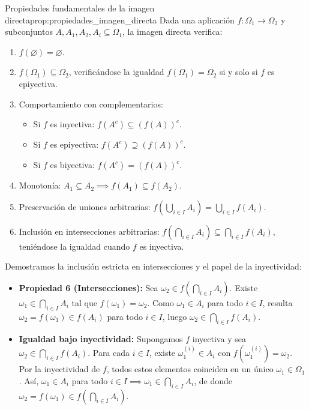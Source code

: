 \begin{proposicion}{Propiedades fundamentales de la imagen directa}{prop:propiedades_imagen_directa}
Dada una aplicación $f: \Omega_1 \to \Omega_2$ y subconjuntos $A, A_1, A_2, A_i \subseteq \Omega_1$, la imagen directa verifica:
\begin{enumerate}[label=\arabic*)]
    \item $f(\varnothing) = \varnothing$.
    \item $f(\Omega_1) \subseteq \Omega_2$, verificándose la igualdad $f(\Omega_1) = \Omega_2$ si y solo si $f$ es epiyectiva.
    \item Comportamiento con complementarios:
    \begin{itemize}
        \item Si $f$ es inyectiva: $f(A^c) \subseteq (f(A))^c$.
        \item Si $f$ es epiyectiva: $f(A^c) \supseteq (f(A))^c$.
        \item Si $f$ es biyectiva: $f(A^c) = (f(A))^c$.
    \end{itemize}
    \item Monotonía: $A_1 \subseteq A_2 \implies f(A_1) \subseteq f(A_2)$.
    \item Preservación de uniones arbitrarias: $\displaystyle f\left( \bigcup_{i \in I} A_i \right) = \bigcup_{i \in I} f(A_i)$.
    \item Inclusión en intersecciones arbitrarias: $\displaystyle f\left( \bigcap_{i \in I} A_i \right) \subseteq \bigcap_{i \in I} f(A_i)$, teniéndose la igualdad cuando $f$ es inyectiva.
\end{enumerate}

\tcblower

\begin{demostracion}
Demostramos la inclusión estricta en intersecciones y el papel de la inyectividad:
\begin{itemize}
    \item \textbf{Propiedad 6 (Intersecciones):} Sea $\omega_2 \in f\left(\bigcap_{i \in I} A_i\right)$. Existe $\omega_1 \in \bigcap_{i \in I} A_i$ tal que $f(\omega_1) = \omega_2$. Como $\omega_1 \in A_i$ para todo $i \in I$, resulta $\omega_2 = f(\omega_1) \in f(A_i)$ para todo $i \in I$, luego $\omega_2 \in \bigcap_{i \in I} f(A_i)$.

    \item \textbf{Igualdad bajo inyectividad:} Supongamos $f$ inyectiva y sea $\omega_2 \in \bigcap_{i \in I} f(A_i)$. Para cada $i \in I$, existe $\omega_1^{(i)} \in A_i$ con $f(\omega_1^{(i)}) = \omega_2$. Por la inyectividad de $f$, todos estos elementos coinciden en un único $\omega_1 \in \Omega_1$. Así, $\omega_1 \in A_i$ para todo $i \in I \implies \omega_1 \in \bigcap_{i \in I} A_i$, de donde $\omega_2 = f(\omega_1) \in f\left(\bigcap_{i \in I} A_i\right)$.
\end{itemize}
\end{demostracion}
\end{proposicion}

